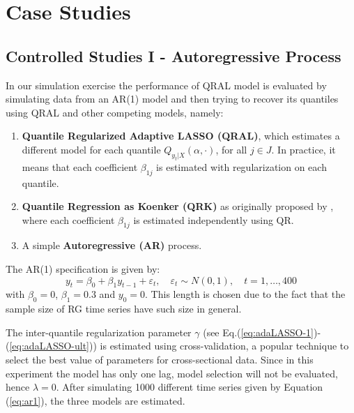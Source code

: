 \section{Case Studies}


\subsection{Controlled Studies I - Autoregressive Process} \label{sec:ar-study}


In our simulation exercise the performance of QRAL model is evaluated by simulating data from an AR(1) model and then trying to recover its quantiles using QRAL and other competing models, namely:
\begin{enumerate}
\item \textbf{Quantile Regularized Adaptive LASSO (QRAL)}, which estimates a different model for each quantile $Q_{y_t|X}(\alpha,\cdot)$, for all ${j \in J}$. In practice, it means that each coefficient $\beta_{1j}$ is estimated with regularization on each quantile. %
\item \textbf{Quantile Regression as Koenker (QRK)} as originally proposed by \cite{koenker1978regression}, where each coefficient $\beta_{1j}$ is estimated independently using QR. 
\item A simple \textbf{Autoregressive (AR)} process.
\end{enumerate}

The AR(1) specification is given by:
\begin{equation}
y_t = \beta_0 + \beta_1 y_{t-1} + \varepsilon_t, \quad \varepsilon_t \sim N(0, 1), \quad t=1,\dots,400 \label{eq:ar1}
\end{equation}
with $\beta_0 = 0$, $\beta_1 = 0.3$ and $y_0 = 0$. This length is chosen due to the fact that the sample size of RG time series have such size in general.

The inter-quantile regularization parameter $\gamma$ (see Eq.(\ref{eq:adaLASSO-1})-(\ref{eq:adaLASSO-ult})) is estimated using cross-validation, a popular technique to select the best value of parameters for cross-sectional data. 
Since in this experiment the model has only one lag, model selection will not be evaluated, hence $\lambda=0$.
After simulating 1000 different time series given by Equation (\ref{eq:ar1}), the three models are estimated.

